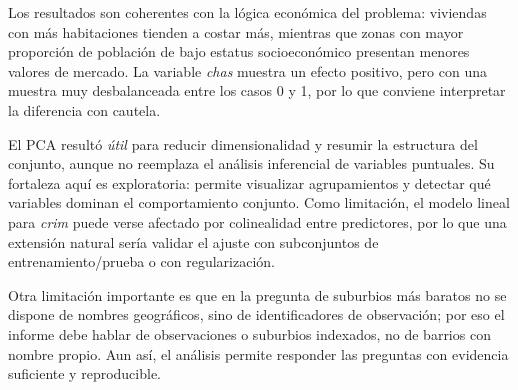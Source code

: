 Los resultados son coherentes con la l\'ogica econ\'omica del problema: viviendas con m\'as habitaciones tienden a costar m\'as, mientras que zonas con mayor proporci\'on de poblaci\'on de bajo estatus socioecon\'omico presentan menores valores de mercado. La variable \textit{chas} muestra un efecto positivo, pero con una muestra muy desbalanceada entre los casos 0 y 1, por lo que conviene interpretar la diferencia con cautela.

El PCA result\'o \textit{útil} para reducir dimensionalidad y resumir la estructura del conjunto, aunque no reemplaza el an\'alisis inferencial de variables puntuales. Su fortaleza aqu\'i es exploratoria: permite visualizar agrupamientos y detectar qu\'e variables dominan el comportamiento conjunto. Como limitaci\'on, el modelo lineal para \textit{crim} puede verse afectado por colinealidad entre predictores, por lo que una extensi\'on natural ser\'ia validar el ajuste con subconjuntos de entrenamiento/prueba o con regularizaci\'on.

Otra limitaci\'on importante es que en la pregunta de suburbios m\'as baratos no se dispone de nombres geogr\'aficos, sino de identificadores de observaci\'on; por eso el informe debe hablar de observaciones o suburbios indexados, no de barrios con nombre propio. Aun as\'i, el an\'alisis permite responder las preguntas con evidencia suficiente y reproducible.